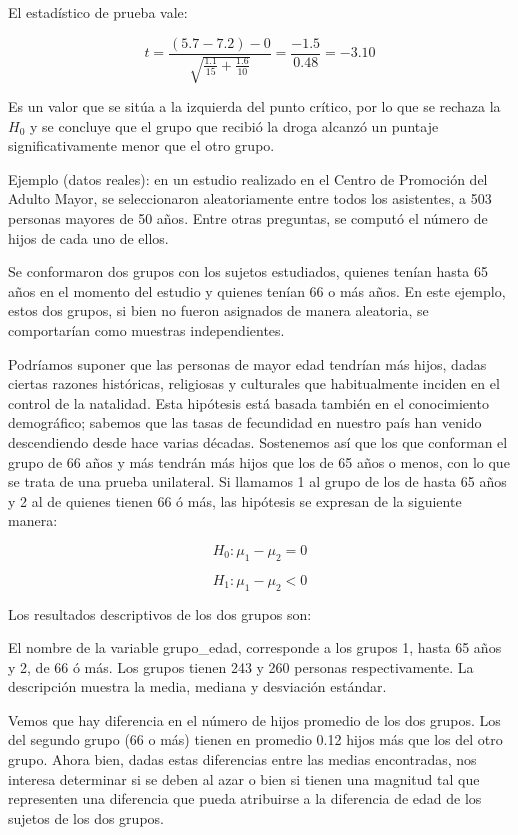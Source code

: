 \documentclass[]{book}
\begin{document}
El estadístico de prueba vale:

\[t = \frac{\left( 5.7 - 7.2 \right) - 0}{\sqrt{\frac{1.1}{15} + \frac{1.6}{10}}} = \frac{-1.5}{0.48} = -3.10\]

Es un valor que se sitúa a la izquierda del punto crítico, por lo que se
rechaza la \(H_0\) y se concluye que el grupo que recibió la droga alcanzó
un puntaje significativamente menor que el otro grupo.

Ejemplo (datos reales): en un estudio realizado en el Centro de
Promoción del Adulto Mayor, se seleccionaron aleatoriamente entre todos
los asistentes, a 503 personas mayores de 50 años. Entre otras
preguntas, se computó el número de hijos de cada uno de ellos.

Se conformaron dos grupos con los sujetos estudiados, quienes tenían
hasta 65 años en el momento del estudio y quienes tenían 66 o más años.
En este ejemplo, estos dos grupos, si bien no fueron asignados de manera
aleatoria, se comportarían como muestras independientes.

Podríamos suponer que las personas de mayor edad tendrían más hijos,
dadas ciertas razones históricas, religiosas y culturales que
habitualmente inciden en el control de la natalidad. Esta hipótesis está
basada también en el conocimiento demográfico; sabemos que las tasas de
fecundidad en nuestro país han venido descendiendo desde hace varias
décadas. Sostenemos así que los que conforman el grupo de 66 años y más
tendrán más hijos que los de 65 años o menos, con lo que se trata de una
prueba unilateral. Si llamamos 1 al grupo de los de hasta 65 años y 2 al
de quienes tienen 66 ó más, las hipótesis se expresan de la siguiente
manera:

\[H_{0}:\mu_{1} - \mu_{2} = 0\]

\[H_{1}:\mu_{1} - \mu_{2} < 0\]

Los resultados descriptivos de los dos grupos son:

El nombre de la variable grupo\_edad, corresponde a los grupos 1, hasta 65 años y 2, de 66 ó más. Los grupos tienen 243 y 260 personas
respectivamente. La descripción muestra la media, mediana y desviación estándar.

Vemos que hay diferencia en el número de hijos promedio de los dos
grupos. Los del segundo grupo (66 o más) tienen en promedio 0.12 hijos
más que los del otro grupo. Ahora bien, dadas estas diferencias entre
las medias encontradas, nos interesa determinar si se deben al azar o
bien si tienen una magnitud tal que representen una diferencia que pueda
atribuirse a la diferencia de edad de los sujetos de los dos grupos.
\end{document}
